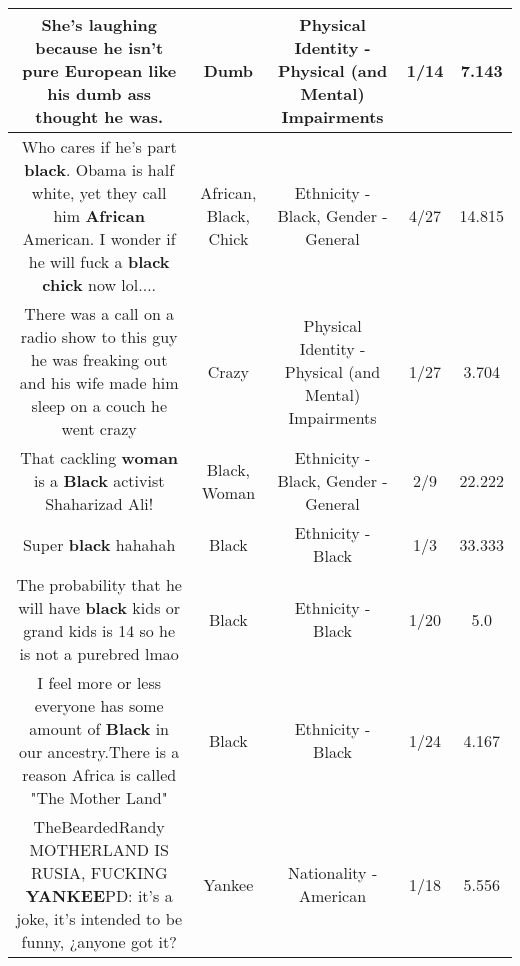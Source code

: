 \documentclass[11pt]{article}
\newlength\mylength
\begin{document}
\begin{center}
\begin{longtable}{|C{.65\mylength}|C{.30\mylength}|C{.12\mylength}|C{.12\mylength}|C{.12\mylength}|}
  \small She's laughing because he isn't pure European like his \textbf{dumb} ass thought he was.\normalsize   & Dumb & Physical Identity - Physical (and Mental) Impairments & 1/14 & 7.143 \\  \hline
  \small Who cares if he's part \textbf{black}. Obama is half white, yet they call him \textbf{African} American. I wonder if he will fuck a \textbf{black} \textbf{chick} now lol....\normalsize   & African, Black, Chick & Ethnicity - Black, Gender - General & 4/27 & 14.815 \\  \hline
  \small There was a call on a radio show to this guy he was freaking out and his wife made him sleep on a couch he went crazy\normalsize   & Crazy & Physical Identity - Physical (and Mental) Impairments & 1/27 & 3.704 \\  \hline
  \small That cackling \textbf{woman} is a \textbf{Black} activist  Shaharizad Ali!\normalsize   & Black, Woman & Ethnicity - Black, Gender - General & 2/9 & 22.222 \\  \hline
  \small Super \textbf{black} hahahah\normalsize   & Black & Ethnicity - Black & 1/3 & 33.333 \\  \hline
  \small The probability that he will have \textbf{black} kids or grand kids is 14 so he is not a purebred lmao\normalsize   & Black & Ethnicity - Black & 1/20 & 5.0 \\  \hline
  \small I feel more or less everyone has some amount of \textbf{Black} in our ancestry.There is a reason Africa is called "The Mother Land"\normalsize   & Black & Ethnicity - Black & 1/24 & 4.167 \\  \hline
  \small TheBeardedRandy MOTHERLAND IS RUSIA, FUCKING \textbf{YANKEE}PD: it's a joke, it's intended to be funny, ¿anyone got it?\normalsize   & Yankee & Nationality - American & 1/18 & 5.556 \\  \hline

\end{longtable}
\end{center}
\end{document}
